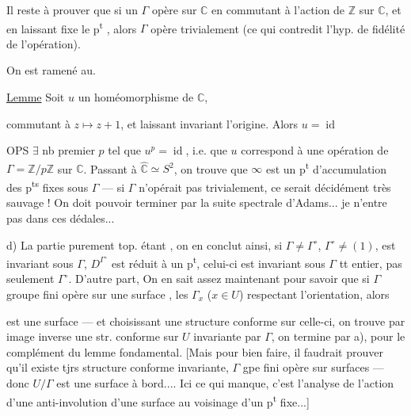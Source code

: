  Il reste à prouver que si un  $\Gamma$ opère sur $\mathbb C$ en commutant  à l'action de $\mathbb Z$ sur $\mathbb C$, et en laissant  fixe le p\textsuperscript{t} , alors $\Gamma$ opère trivialement (ce qui contredit l'hyp. de fidélité de l'opération).

 On est ramené au.

\uline{Lemme} Soit $u$ un homéomorphisme  de $\mathbb C$,


commutant à $z\longmapsto z+1$, et laissant invariant l'origine. Alors $u=\operatorname{id}$

OPS  $\exists$ nb premier $p$ tel que $u^p=\operatorname{id}$, i.e. que $u$ correspond à une opération de $\Gamma=\mathbb Z/p\mathbb Z$ sur $\mathbb C$.  Passant à $\widehat{\mathbb C}\simeq S^2$, on trouve que $\infty$ est un p\textsuperscript{t} d'accumulation des p\textsuperscript{ts} fixes sous $\Gamma$ --- si $\Gamma$ n'opérait pas trivialement, ce serait décidément très sauvage ! On doit pouvoir terminer par la suite spectrale d'Adams... je n'entre pas dans ces dédales...

 d) La partie purement top. étant   , on en conclut ainsi, si $\Gamma\ne\Gamma^\circ$, $\Gamma^\circ\ne(1)$,     est invariant sous $\Gamma$,   $D^{\Gamma^\circ}$ est réduit à un p\textsuperscript{t}, celui-ci est invariant sous $\Gamma$ tt entier, pas seulement $\Gamma^\circ$. D'autre part, On en sait assez maintenant pour savoir que si $\Gamma$ groupe fini opère sur une surface  , les $\Gamma_x$ ($x\in U$) respectant l'orientation, alors 


est une surface ---  et choisissant une structure conforme sur celle-ci, on trouve par image inverse une str. conforme sur $U$ invariante par $\Gamma$,   on termine par a),  pour le complément du lemme fondamental. [Mais pour bien faire, il faudrait prouver qu'il existe tjrs structure conforme invariante,  $\Gamma$ gpe fini opère sur surfaces   --- donc $U/\Gamma$ est une surface à bord.... Ici ce qui manque, c'est l'analyse de l'action d'une anti-involution d'une surface au voisinage d'un p\textsuperscript{t} fixe...]

